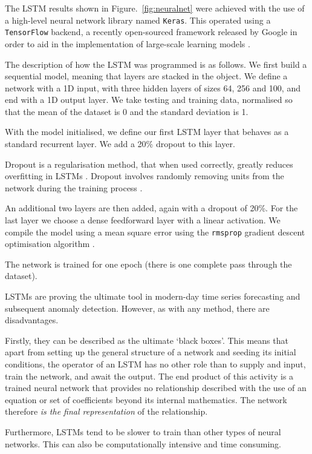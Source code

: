 The LSTM results shown in Figure.~\ref{fig:neuralnet} were achieved with the use of a high-level neural network library named \texttt{Keras}. This operated using a \texttt{TensorFlow} backend, a recently open-sourced framework released by Google in order to aid in the implementation of large-scale learning models \cite{Abadi:2016:TSL:3026877.3026899}.

The description of how the LSTM was programmed is as follows. We first build a sequential model, meaning that layers are stacked in the object.  We define a network with a 1D input, with three hidden layers of sizes 64, 256 and 100, and end with a 1D output layer. We take testing and training data, normalised so that the mean of the dataset is 0 and the standard deviation is 1.

With the model initialised, we define our first LSTM layer that behaves as a standard recurrent layer. We add a 20\% dropout to this layer. 

Dropout is a regularisation method, that when used correctly, greatly reduces overfitting in LSTMs \cite{2014arXiv1409.2329Z}. Dropout involves randomly removing units from the network during the training process \cite{2013arXiv1311.0701B}.

An additional two layers are then added, again with a dropout of 20\%. For the last layer we choose a dense feedforward layer with a linear activation. We compile the model using a mean square error using the \texttt{rmsprop} gradient descent optimisation algorithm \cite{tieleman2012lecture}.

The network is trained for one epoch (there is one complete pass through the dataset).

LSTMs are proving the ultimate tool in modern-day time series forecasting and subsequent anomaly detection. However, as with any method, there are disadvantages.

Firstly, they can be described as the ultimate `black boxes'. This means that apart from setting up the general structure of a network and seeding its initial conditions, the operator of an LSTM has no other role than to supply and input, train the network, and await the output. The end product of this activity is a trained neural network that provides no relationship described with the use of an equation or set of coefficients beyond its internal mathematics. The network therefore \emph{is the final representation} of the relationship.

Furthermore, LSTMs tend to be slower to train than other types of neural networks. This can also be computationally intensive and time consuming.

